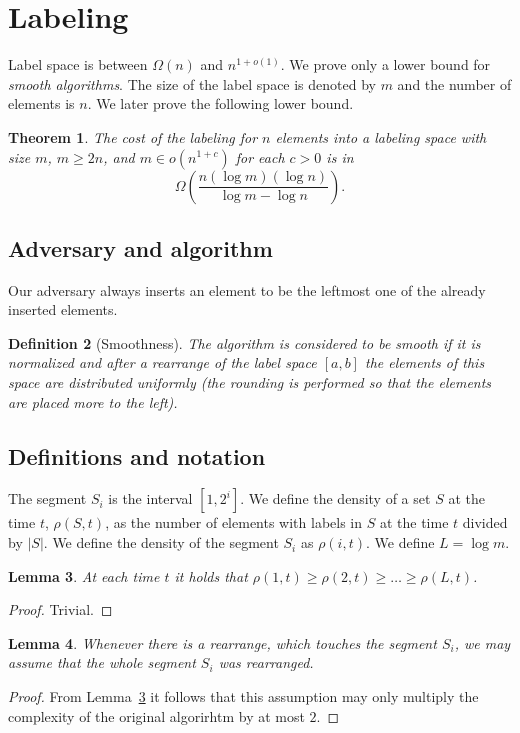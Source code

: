 \documentclass[11pt]{article} %
\newcommand{\density}[2]{\rho(#1, #2)}
\newtheorem{definition}{Definition} %
\newtheorem{theorem}[definition]{Theorem}
\newtheorem{lemma}[definition]{Lemma}
\begin{document}
\section{Labeling}

Label space is between $\Omega(n)$ and $n^{1 + o(1)}$.
We prove only a lower bound for \emph{smooth algorithms}.
The size of the label space is denoted by $m$ and the number of elements is $n$.
We later prove the following lower bound.
\begin{theorem}
\label{thm:lower-bound}
The cost of the labeling for $n$ elements into a labeling space with size $m$, $m \geq 2n$, and $m \in o\left(n^{1 + c}\right)$ for each $c > 0$ is in
\[
\Omega\left(\frac{n(\log m)(\log n)}{\log m - \log n}\right).
\]
\end{theorem}

\subsection{Adversary and algorithm}
Our adversary always inserts an element to be the leftmost one of the already inserted elements.
\begin{definition}[Smoothness]
The algorithm is considered to be \emph{smooth} if it is normalized and after a rearrange of the label space $[a, b]$ the elements of this space are distributed uniformly (the rounding is performed so that the elements are placed more to the left).
\end{definition}

\subsection{Definitions and notation}
The segment $S_i$ is the interval $[1, 2^i]$.
We define the density of a set $S$ at the time $t$, $\density{S}{t}$, as the number of elements with labels in $S$ at the time $t$ divided by $|S|$.
We define the density of the segment $S_i$ as $\density{i}{t}$.
We define $L = \log m$.

\begin{lemma}
\label{lm:descreasing-density}
At each time $t$ it holds that $\density{1}{t} \geq \density{2}{t} \geq \dots \geq \density{L}{t}$.
\end{lemma}
\begin{proof}
Trivial.
\end{proof}

\begin{lemma}
Whenever there is a rearrange, which touches the segment $S_i$, we may assume that the whole segment $S_i$ was rearranged.
\end{lemma}
\begin{proof}
From Lemma~\ref{lm:descreasing-density} it follows that this assumption may only multiply the complexity of the original algorirhtm by at most $2$.
\end{proof}
\end{document}
